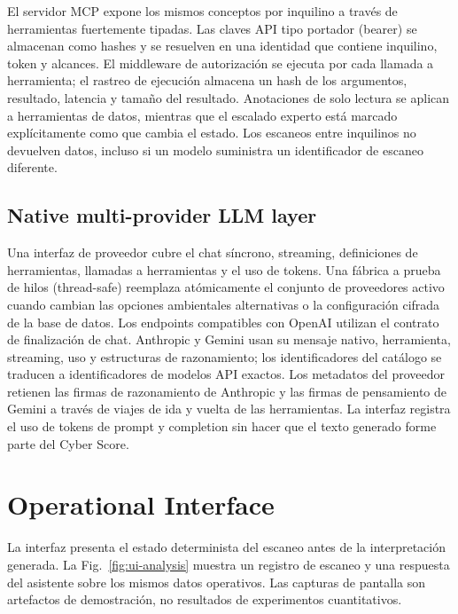 \documentclass[conference,a4paper]{IEEEtran}
\begin{document}
El servidor MCP expone los mismos conceptos por inquilino a través de herramientas fuertemente tipadas. Las claves API tipo portador (bearer) se almacenan como hashes y se resuelven en una identidad que contiene inquilino, token y alcances. El middleware de autorización se ejecuta por cada llamada a herramienta; el rastreo de ejecución almacena un hash de los argumentos, resultado, latencia y tamaño del resultado. Anotaciones de solo lectura se aplican a herramientas de datos, mientras que el escalado experto está marcado explícitamente como que cambia el estado. Los escaneos entre inquilinos no devuelven datos, incluso si un modelo suministra un identificador de escaneo diferente.

\subsection{Native multi-provider LLM layer}

Una interfaz de proveedor cubre el chat síncrono, streaming, definiciones de herramientas, llamadas a herramientas y el uso de tokens. Una fábrica a prueba de hilos (thread-safe) reemplaza atómicamente el conjunto de proveedores activo cuando cambian las opciones ambientales alternativas o la configuración cifrada de la base de datos. Los endpoints compatibles con OpenAI utilizan el contrato de finalización de chat. Anthropic y Gemini usan su mensaje nativo, herramienta, streaming, uso y estructuras de razonamiento; los identificadores del catálogo se traducen a identificadores de modelos API exactos. Los metadatos del proveedor retienen las firmas de razonamiento de Anthropic y las firmas de pensamiento de Gemini a través de viajes de ida y vuelta de las herramientas. La interfaz registra el uso de tokens de prompt y completion sin hacer que el texto generado forme parte del Cyber Score.

\section{Operational Interface}

La interfaz presenta el estado determinista del escaneo antes de la interpretación generada. La Fig.~\ref{fig:ui-analysis} muestra un registro de escaneo y una respuesta del asistente sobre los mismos datos operativos. Las capturas de pantalla son artefactos de demostración, no resultados de experimentos cuantitativos.
\end{document}
